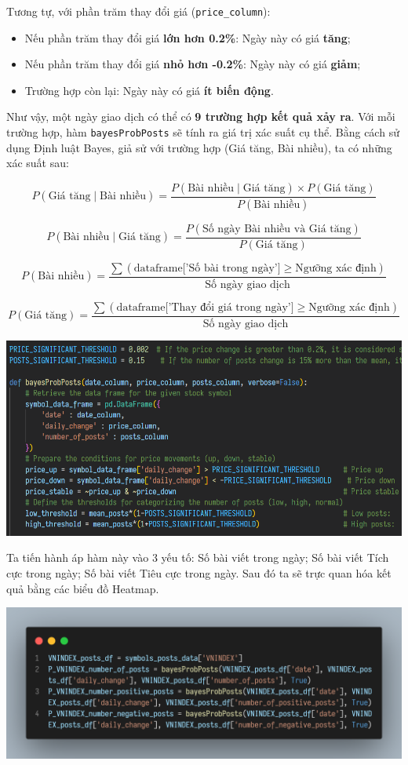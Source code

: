 Tương tự, với phần trăm thay đổi giá (\texttt{price\_column}):
\begin{itemize}
\item Nếu phần trăm thay đổi giá \textbf{lớn hơn 0.2\%}: Ngày này có giá \textbf{tăng};
\item Nếu phần trăm thay đổi giá \textbf{nhỏ hơn -0.2\%}: Ngày này có giá \textbf{giảm};
\item Trường hợp còn lại: Ngày này có giá \textbf{ít biến động}.
\end{itemize}

Như vậy, một ngày giao dịch có thể có \textbf{9 trường hợp kết quả xảy ra}. Với mỗi trường hợp, hàm \texttt{bayesProbPosts} sẽ tính ra giá trị xác suất cụ thể. Bằng cách sử dụng Định luật Bayes, giả sử với trường hợp (Giá tăng, Bài nhiều), ta có những xác suất sau:

 \[
P(\text{Giá tăng} \mid \text{Bài nhiều}) = \frac{P(\text{Bài nhiều} \mid \text{Giá tăng}) \times P(\text{Giá tăng})}{P(\text{Bài nhiều})}
\]

\[
P(\text{Bài nhiều} \mid \text{Giá tăng}) = \frac{P(\text{Số ngày Bài nhiều và Giá tăng})}{P(\text{Giá tăng})}
\]

\[
P(\text{Bài nhiều}) = \frac{\sum (\text{dataframe['Số bài trong ngày']} \geq \text{Ngưỡng xác định})}{\text{Số ngày giao dịch}}
\]

\[
P(\text{Giá tăng}) = \frac{\sum (\text{dataframe['Thay đổi giá trong ngày']} \geq \text{Ngưỡng xác định})}{\text{Số ngày giao dịch}}
\]

\begin{center}
\includegraphics[width=0.7\linewidth]{images/code-5.4.png}
\end{center}

Ta tiến hành áp hàm này vào 3 yếu tố: Số bài viết trong ngày; Số bài viết Tích cực trong ngày; Số bài viết Tiêu cực trong ngày. Sau đó ta sẽ trực quan hóa kết quả bằng các biểu đồ Heatmap.

\begin{center}
\includegraphics[width=0.75\linewidth]{images/code-5.5.png}
\end{center}

